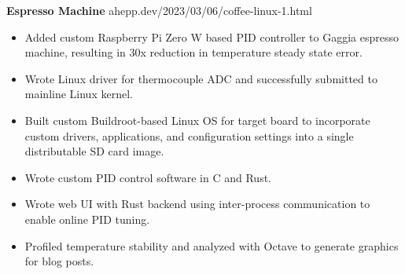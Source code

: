 \noindent \textbf{Espresso Machine} \hfill ahepp.dev/2023/03/06/coffee-linux-1.html
\begin{itemize}
    \item Added custom Raspberry Pi Zero W based PID controller to Gaggia espresso machine, resulting in 30x reduction in temperature steady state error.
    \item Wrote Linux driver for thermocouple ADC and successfully submitted to mainline Linux kernel.
    \item Built custom Buildroot-based Linux OS for target board to incorporate custom drivers, applications, and configuration settings into a single distributable SD card image.
    \item Wrote custom PID control software in C and Rust.
    \item Wrote web UI with Rust backend using inter-process communication to enable online PID tuning.
    \item Profiled temperature stability and analyzed with Octave to generate graphics for blog posts.
\end{itemize}
